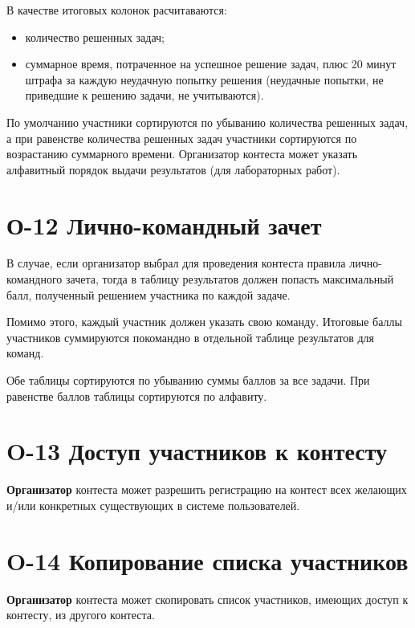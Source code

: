 \documentclass{book}
\newcommand{\newcard}[1]{\newpage \section*{#1}}
\begin{document}
	В качестве итоговых колонок расчитаваются:
	\begin{itemize}
		\item количество решенных задач;
		\item суммарное время, потраченное на успешное решение задач, плюс 20 минут штрафа за каждую неудачную попытку решения (неудачные попытки, не приведшие к решению задачи, не учитываются).
	\end{itemize} 
	
	По умолчанию участники сортируются по убыванию количества решенных задач, а при равенстве количества решенных задач участники сортируются по возрастанию суммарного времени. Организатор контеста может указать алфавитный порядок выдачи результатов (для лабораторных работ).


\newcard{О-12 Лично-командный зачет}
	В случае, если организатор выбрал для проведения контеста правила лично-командного зачета, тогда в таблицу результатов должен попасть максимальный балл, полученный решением участника по каждой задаче.

	Помимо этого, каждый участник должен указать свою команду. Итоговые баллы участников суммируются покомандно в отдельной таблице результатов для команд.

	Обе таблицы сортируются по убыванию суммы баллов за все задачи. При равенстве баллов таблицы сортируются по алфавиту.

\newcard{O-13 Доступ участников к контесту}
	\textbf{Организатор} контеста может разрешить регистрацию на контест всех желающих и/или конкретных существующих в системе пользователей.

\newcard{O-14 Копирование списка участников}
	\textbf{Организатор} контеста может скопировать список участников, имеющих доступ к контесту, из другого контеста.
\end{document}
